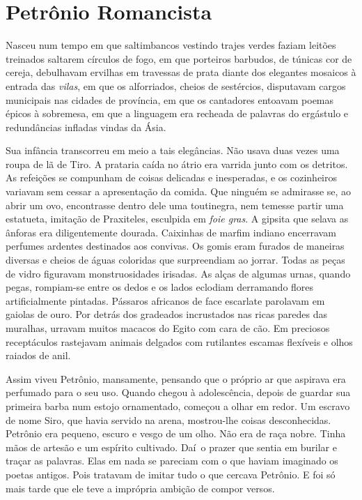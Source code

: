 \chapter{Petrônio Romancista}

Nasceu num tempo em que saltimbancos vestindo trajes verdes faziam leitões
treinados saltarem círculos de fogo, em que porteiros barbudos, de túnicas
cor de cereja, debulhavam ervilhas em travessas de prata diante dos
elegantes mosaicos à entrada das \textit{vilas}, em que os alforriados,
cheios de sestércios, disputavam cargos municipais nas cidades de
província, em que os cantadores entoavam poemas épicos à sobremesa, em que
a linguagem era recheada de palavras do ergástulo e redundâncias infladas
vindas da Ásia.

Sua infância transcorreu em meio a tais elegâncias. Não usava duas vezes
uma roupa de lã de Tiro. A prataria caída no átrio era varrida junto com
os detritos. As refeições se compunham de coisas delicadas e inesperadas,
e os cozinheiros variavam sem cessar a apresentação da comida. Que ninguém se admirasse se, 
ao abrir um ovo, encontrasse dentro dele uma toutinegra, nem
temesse partir uma estatueta, imitação de Praxiteles, esculpida em
\textit{foie gras}. A gipsita que selava as ânforas era diligentemente
dourada. Caixinhas de marfim indiano encerravam perfumes ardentes
destinados aos convivas. Os gomis eram furados de maneiras diversas e
cheios de águas coloridas que surpreendiam ao jorrar. Todas as peças de
vidro figuravam monstruosidades irisadas. As alças de algumas urnas,
quando pegas, rompiam-se entre os dedos e os lados eclodiam derramando
flores artificialmente pintadas. Pássaros africanos de face escarlate
parolavam em gaiolas de ouro. Por detrás dos gradeados incrustados nas
ricas paredes das muralhas, urravam muitos macacos do Egito com cara de
cão. Em preciosos receptáculos rastejavam animais delgados com rutilantes
escamas flexíveis e olhos raiados de anil.

Assim viveu Petrônio, mansamente, pensando que o próprio ar que aspirava
era perfumado para o seu uso. Quando chegou à adolescência, depois de
guardar sua primeira barba num estojo ornamentado, começou a olhar em
redor. Um escravo de nome Siro, que havia servido na arena, mostrou-lhe
coisas desconhecidas. Petrônio era pequeno, escuro e vesgo de um olho. Não
era de raça nobre. Tinha mãos de artesão e um espírito cultivado. Daí~o
prazer que sentia em burilar e traçar as palavras. Elas em nada se
pareciam com o que haviam imaginado os poetas antigos. Pois tratavam de
imitar tudo o que cercava Petrônio. E foi só mais tarde que ele teve a
imprópria ambição de compor versos.

